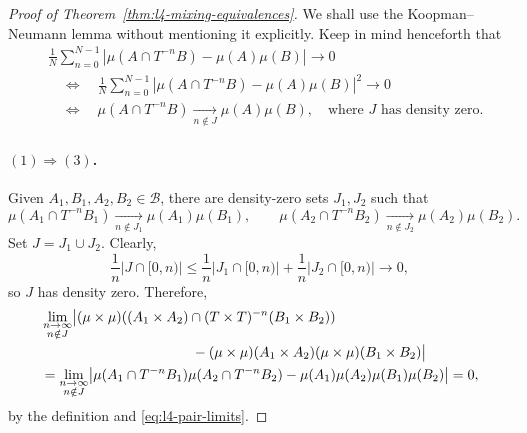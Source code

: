 \documentclass[11pt,a4paper]{article}
\begin{document}
\begin{proof}[Proof of Theorem~\ref{thm:l4-mixing-equivalences}]
We shall use the Koopman--Neumann lemma without mentioning it explicitly.
Keep in mind henceforth that
\[
 \begin{aligned}
 &\frac1N\sum_{n=0}^{N-1}
  |\mu(A\cap T^{-n}B)-\mu(A)\mu(B)|\longrightarrow0\\
 &\quad\Longleftrightarrow\quad
 \frac1N\sum_{n=0}^{N-1}
  |\mu(A\cap T^{-n}B)-\mu(A)\mu(B)|^2\longrightarrow0\\
 &\quad\Longleftrightarrow\quad
 \mu(A\cap T^{-n}B)\xrightarrow[n\notin J]{}\mu(A)\mu(B),
 \quad\text{where $J$ has density zero.}
 \end{aligned}
\]
\paragraph{$(1)\Longrightarrow(3)$.}
Given $A_1,B_1,A_2,B_2\in\mathcal B$, there are density-zero sets
$J_1,J_2$ such that
\begin{equation}
 \mu(A_1\cap T^{-n}B_1)\xrightarrow[n\notin J_1]{}\mu(A_1)\mu(B_1),
 \qquad
 \mu(A_2\cap T^{-n}B_2)\xrightarrow[n\notin J_2]{}\mu(A_2)\mu(B_2).
 \tag{$*$}\label{eq:l4-pair-limits}
\end{equation}
Set $J=J_1\cup J_2$. Clearly,
\[
 \frac1n|J\cap[0,n)|
 \leq\frac1n|J_1\cap[0,n)|+\frac1n|J_2\cap[0,n)|\longrightarrow0,
\]
so $J$ has density zero. Therefore,
\[
 \begin{aligned}
 &\lim_{\substack{n\to\infty\\n\notin J}}
 \bigl|(\mu\times\mu)((A_1\times A_2)\cap(T\times T)^{-n}(B_1\times B_2))\\
 &\hspace{38mm}-(\mu\times\mu)(A_1\times A_2)(\mu\times\mu)(B_1\times B_2)\bigr|\\
 &=\lim_{\substack{n\to\infty\\n\notin J}}
 \bigl|\mu(A_1\cap T^{-n}B_1)\mu(A_2\cap T^{-n}B_2)
 -\mu(A_1)\mu(A_2)\mu(B_1)\mu(B_2)\bigr|=0,
 \end{aligned}
\]
by the definition and \eqref{eq:l4-pair-limits}.


\end{proof}
\end{document}
